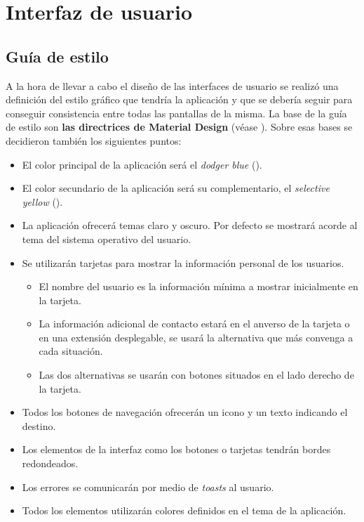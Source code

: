 \chapter{Interfaz de usuario}
\label{ch:diseño_interfaz_usuario}

\section{Guía de estilo}

A la hora de llevar a cabo el diseño de las interfaces de usuario se realizó una definición del estilo gráfico que tendría la aplicación y que se debería seguir para conseguir consistencia entre todas las pantallas de la misma. La base de la guía de estilo son \textbf{las directrices de Material Design} (véase ). Sobre esas bases se decidieron también los siguientes puntos:

\begin{itemize}
    \item El color principal de la aplicación será el \emph{dodger blue} ().
    \item El color secundario de la aplicación será su complementario, el \emph{selective yellow} ().
    \item La aplicación ofrecerá temas claro y oscuro. Por defecto se mostrará acorde al tema del sistema operativo del usuario.
    \item Se utilizarán tarjetas para mostrar la información personal de los usuarios. 
    \begin{itemize}
        \item El nombre del usuario es la información mínima a mostrar inicialmente en la tarjeta.
        \item La información adicional de contacto estará en el anverso de la tarjeta o en una extensión desplegable, se usará la alternativa que más convenga a cada situación.
        \item Las dos alternativas se usarán con botones situados en el lado derecho de la tarjeta.
    \end{itemize}
    \item Todos los botones de navegación ofrecerán un icono y un texto indicando el destino.
    \item Los elementos de la interfaz como los botones o tarjetas tendrán bordes redondeados.
    \item Los errores se comunicarán por medio de \emph{toasts} al usuario.
    \item Todos los elementos utilizarán colores definidos en el tema de la aplicación.
\end{itemize}


